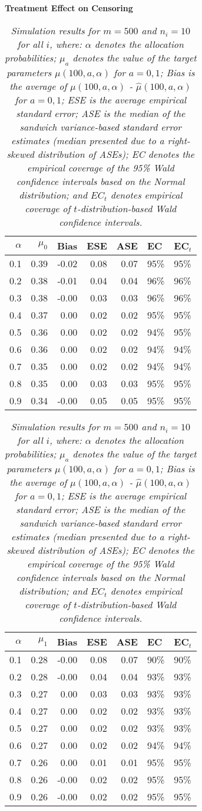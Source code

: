 \documentclass[12pt, letterpaper]{article}
\begin{document}
\clearpage

\begin{center}
\textbf{Treatment Effect on Censoring} 
\end{center}
\begin{table}[ht!]
\centering
\bgroup
\def\arraystretch{1.25}
\setlength\tabcolsep{0.05in}
\begin{tabular}{rrrrrll}
  \hline
$\alpha$ & $\mu_0$ & Bias & ESE & ASE & EC & EC$_t$ \\ 
  \hline
0.1 & 0.39 & -0.02 & 0.08 & 0.07 & 95\% & 95\% \\ 
  0.2 & 0.38 & -0.01 & 0.04 & 0.04 & 96\% & 96\% \\ 
  0.3 & 0.38 & -0.00 & 0.03 & 0.03 & 96\% & 96\% \\ 
  0.4 & 0.37 & 0.00 & 0.02 & 0.02 & 95\% & 95\% \\ 
  0.5 & 0.36 & 0.00 & 0.02 & 0.02 & 94\% & 95\% \\ 
  0.6 & 0.36 & 0.00 & 0.02 & 0.02 & 94\% & 94\% \\ 
  0.7 & 0.35 & 0.00 & 0.02 & 0.02 & 94\% & 94\% \\ 
  0.8 & 0.35 & 0.00 & 0.03 & 0.03 & 95\% & 95\% \\ 
  0.9 & 0.34 & -0.00 & 0.05 & 0.05 & 95\% & 95\% \\    \hline
\end{tabular}
\egroup
\quad 
\bgroup
\setlength\tabcolsep{0.05in}
\def\arraystretch{1.25}
\begin{tabular}{rrrrrll}
  \hline
$\alpha$ & $\mu_1$ & Bias & ESE & ASE & EC & EC$_t$ \\ 
  \hline
0.1 & 0.28 & -0.00 & 0.08 & 0.07 & 90\% & 90\% \\ 
  0.2 & 0.28 & -0.00 & 0.04 & 0.04 & 93\% & 93\% \\ 
  0.3 & 0.27 & 0.00 & 0.03 & 0.03 & 93\% & 93\% \\ 
  0.4 & 0.27 & 0.00 & 0.02 & 0.02 & 93\% & 93\% \\ 
  0.5 & 0.27 & 0.00 & 0.02 & 0.02 & 93\% & 93\% \\ 
  0.6 & 0.27 & 0.00 & 0.02 & 0.02 & 94\% & 94\% \\ 
  0.7 & 0.26 & 0.00 & 0.01 & 0.01 & 95\% & 95\% \\ 
  0.8 & 0.26 & -0.00 & 0.02 & 0.02 & 95\% & 95\% \\ 
  0.9 & 0.26 & -0.00 & 0.02 & 0.02 & 95\% & 95\% \\ 
   \hline
\end{tabular}
\egroup
\caption*{\textit{Simulation results for $m = 500$ and $n_i = 10$ for all $i$, where: $\alpha$ denotes the allocation probabilities; $\mu_a$ denotes the value of the target parameters $\mu(100, a, \alpha)$ for $a=0,1$; Bias is the average of $\mu(100, a, \alpha)$ - $\hat{\mu}(100, a, \alpha)$ for $a=0, 1$; ESE is the average empirical standard error; ASE is the median of the sandwich variance-based standard error estimates (median presented due to a right-skewed distribution of ASEs); EC denotes the empirical coverage of the 95\% Wald confidence intervals based on the Normal distribution; and $EC_t$ denotes empirical coverage of $t$-distribution-based Wald confidence intervals.} \\ 

}
\end{table}
\end{document}
